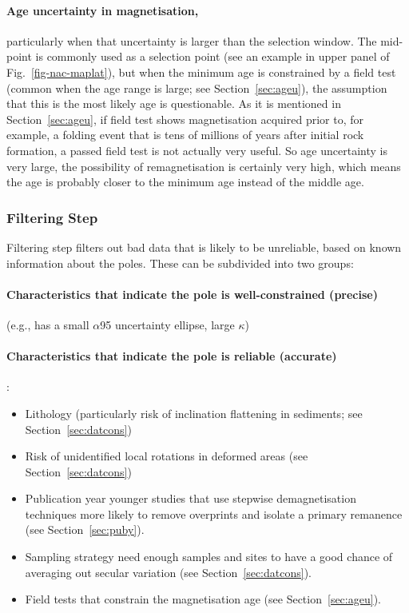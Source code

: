 \paragraph{Age uncertainty in magnetisation,}
particularly when that uncertainty is larger than the selection window. The
mid-point is commonly used as a selection point (see an example in upper panel
of Fig.~\ref{fig-nac-maplat}), but when the minimum age is constrained by a
field test (common when the age range is large; see Section~\ref{sec:ageu}), the
assumption that this is the most likely age is questionable. As it is mentioned
in Section~\ref{sec:ageu}, if field test shows magnetisation acquired prior to,
for example, a folding event that is tens of millions of years after initial
rock formation, a passed field test is not actually very useful. So age
uncertainty is very large, the possibility of remagnetisation is certainly very
high, which means the age is probably closer to the minimum age instead of the
middle age.

\subsubsection{Filtering Step}

Filtering step filters out bad data that is likely to be unreliable, based on
known information about the poles. These can be subdivided into two groups:

\paragraph{Characteristics that indicate the pole is well-constrained
(precise)}
(e.g., has a small $\alpha$95 uncertainty ellipse, large $\kappa$)

\paragraph{Characteristics that indicate the pole is reliable (accurate)}:
\begin{itemize}
  \item Lithology (particularly risk of inclination flattening in sediments; see
        Section~\ref{sec:datcons})
  \item Risk of unidentified local rotations in deformed areas (see Section~\ref{sec:datcons})
  \item Publication year \textemdash{} younger studies that use stepwise
        demagnetisation techniques more likely to remove overprints and isolate
        a primary remanence (see Section~\ref{sec:puby}).
  \item Sampling strategy \textemdash{} need enough samples and sites to have a
        good chance of averaging out secular variation (see Section~\ref{sec:datcons}).
  \item Field tests that constrain the magnetisation age (see Section~\ref{sec:ageu}).
\end{itemize}

